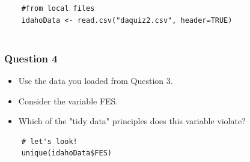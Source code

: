 \documentclass{beamer}
\begin{document}

\begin{frame}[fragile]

\begin{framed}
	\begin{verbatim}
	#from local files
	idahoData <- read.csv("daquiz2.csv", header=TRUE)
	
	\end{verbatim}
\end{framed}

\end{frame}


\begin{frame}[fragile]
\frametitle{Question 4}

\begin{itemize}
	\item Use the data you loaded from Question 3. 
	\item Consider the variable FES. 
	\item Which of the "tidy data" principles does this variable violate?
\end{itemize}

%

\begin{framed} 
	\begin{verbatim}
	# let's look!
	unique(idahoData$FES)
	\end{verbatim}
\end{framed} 

\end{frame}
\end{document}

